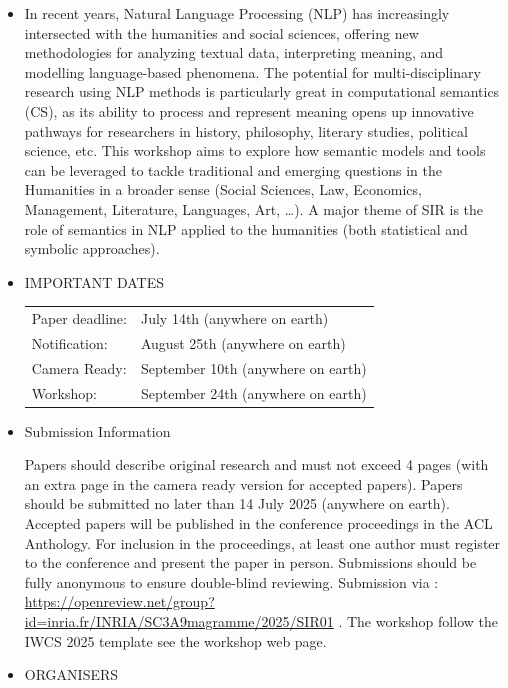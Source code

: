 \documentclass[prodmode,acmtecs]{acmsmall} %
\begin{document}
\begin{itemize}\item  In recent years, Natural Language Processing (NLP) has increasingly intersected with the humanities and social sciences, offering new methodologies for analyzing textual data, interpreting meaning, and modelling language-based phenomena. The potential for multi-disciplinary research using NLP methods is particularly great in computational semantics (CS), as its ability to process and represent meaning opens up innovative pathways for researchers in history, philosophy, literary studies, political science, etc.  This workshop aims to explore how semantic models and tools can be leveraged to tackle traditional and emerging questions in the Humanities in a broader sense (Social Sciences, Law, Economics, Management, Literature, Languages, Art, …). A major theme of  SIR is the role of semantics in NLP applied to the humanities (both statistical and symbolic approaches). 
 
\item  IMPORTANT DATES 
 
\begin{tabulary}{\linewidth}{LL}Paper deadline:  & July 14th (anywhere on earth) \\
Notification:  & August 25th (anywhere on earth) \\
Camera Ready:  & September 10th (anywhere on earth) \\
Workshop:  & September 24th (anywhere on earth) \\
\end{tabulary}
 
\item  Submission Information 
 
  Papers should describe original research and must not exceed 4 pages (with an extra page in the camera ready version for accepted papers). Papers should be submitted no later than 14 July 2025 (anywhere on earth). Accepted papers will be published in the conference proceedings in the ACL Anthology. For inclusion in the proceedings, at least one author must register to the conference and present the paper in person. Submissions should be fully anonymous to ensure double-blind reviewing. Submission via : \href{https://openreview.net/group?id=inria.fr/INRIA/SC3A9magramme/2025/SIR01}{https://openreview.net/group?id=inria.fr/INRIA/SC3A9magramme/2025/SIR01} . The workshop follow the IWCS 2025 template see the workshop web page. 
 
\item  ORGANISERS 
 

\end{itemize}
\end{document}
